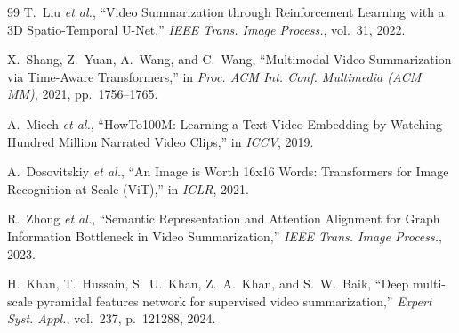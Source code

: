 \documentclass[10pt,conference]{IEEEtran}
\begin{document}
\begin{thebibliography}{99}
T.~Liu \textit{et al.},
``Video Summarization through Reinforcement Learning with a 3D
Spatio-Temporal U-Net,''
\textit{IEEE Trans. Image Process.}, vol.~31, 2022.

X.~Shang, Z.~Yuan, A.~Wang, and C.~Wang,
``Multimodal Video Summarization via Time-Aware Transformers,''
in \textit{Proc. ACM Int. Conf. Multimedia (ACM MM)}, 2021, pp.~1756--1765.

A.~Miech \textit{et al.},
``HowTo100M: Learning a Text-Video Embedding by Watching Hundred Million
Narrated Video Clips,''
in \textit{ICCV}, 2019.

A.~Dosovitskiy \textit{et al.},
``An Image is Worth 16x16 Words: Transformers for Image Recognition at Scale
(ViT),''
in \textit{ICLR}, 2021.

R.~Zhong \textit{et al.},
``Semantic Representation and Attention Alignment for Graph Information
Bottleneck in Video Summarization,''
\textit{IEEE Trans. Image Process.}, 2023.

H.~Khan, T.~Hussain, S.~U.~Khan, Z.~A.~Khan, and S.~W.~Baik,
``Deep multi-scale pyramidal features network for supervised video
summarization,''
\textit{Expert Syst. Appl.}, vol.~237, p.~121288, 2024.

\end{thebibliography}
\end{document}
